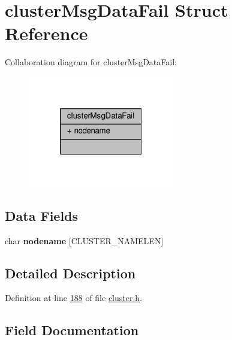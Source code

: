 \hypertarget{structclusterMsgDataFail}{}\section{cluster\+Msg\+Data\+Fail Struct Reference}
\label{structclusterMsgDataFail}


Collaboration diagram for cluster\+Msg\+Data\+Fail\+:\nopagebreak
\begin{figure}[H]
\begin{center}
\leavevmode
\includegraphics[width=181pt]{structclusterMsgDataFail__coll__graph}
\end{center}
\end{figure}
\subsection*{Data Fields}
\begin{DoxyCompactItemize}
\item 
\mbox{\label{structclusterMsgDataFail_aca019d47dd052819120b85344ecfbd30}} 
char {\bfseries nodename} \mbox{[}C\+L\+U\+S\+T\+E\+R\+\_\+\+N\+A\+M\+E\+L\+EN\mbox{]}
\end{DoxyCompactItemize}


\subsection{Detailed Description}


Definition at line \hyperlink{cluster_8h_source_l00188}{188} of file \hyperlink{cluster_8h_source}{cluster.\+h}.



\subsection{Field Documentation}
\mbox{\label{structclusterMsgDataFail_aca019d47dd052819120b85344ecfbd30}} 
